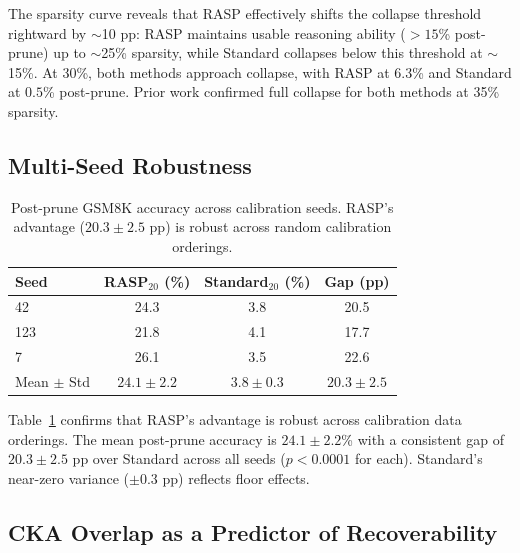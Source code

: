 \documentclass[11pt,a4paper]{article}
\begin{document}
The sparsity curve reveals that RASP effectively shifts the collapse threshold rightward by $\sim$10 pp: RASP maintains usable reasoning ability ($>15$\% post-prune) up to $\sim$25\% sparsity, while Standard collapses below this threshold at $\sim$15\%. At 30\%, both methods approach collapse, with RASP at $6.3$\% and Standard at $0.5$\% post-prune. Prior work confirmed full collapse for both methods at 35\% sparsity.

\subsection{Multi-Seed Robustness}

\begin{table}[t]
\centering
\small
\begin{tabular}{@{}lccc@{}}
\toprule
\textbf{Seed} & \textbf{RASP$_{20}$ (\%)} & \textbf{Standard$_{20}$ (\%)} & \textbf{Gap (pp)} \\
\midrule
42 & 24.3 & 3.8 & 20.5 \\
123 & 21.8 & 4.1 & 17.7 \\
7 & 26.1 & 3.5 & 22.6 \\
\midrule
Mean $\pm$ Std & $24.1 \pm 2.2$ & $3.8 \pm 0.3$ & $20.3 \pm 2.5$ \\
\bottomrule
\end{tabular}
\caption{Post-prune GSM8K accuracy across calibration seeds. RASP's advantage ($20.3 \pm 2.5$ pp) is robust across random calibration orderings.}
\label{tab:seeds}
\end{table}

Table~\ref{tab:seeds} confirms that RASP's advantage is robust across calibration data orderings. The mean post-prune accuracy is $24.1 \pm 2.2$\% with a consistent gap of $20.3 \pm 2.5$ pp over Standard across all seeds ($p < 0.0001$ for each). Standard's near-zero variance ($\pm 0.3$ pp) reflects floor effects.

\subsection{CKA Overlap as a Predictor of Recoverability}
\label{sec:regression}
\end{document}
